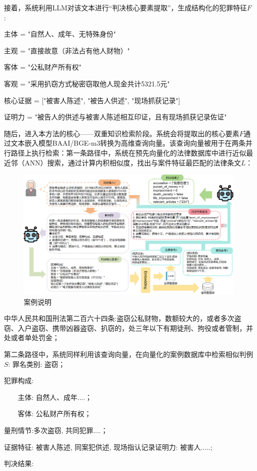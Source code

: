 接着，系统利用LLM对该文本进行“判决核心要素提取”，生成结构化的犯罪特征$F$:

主体 = "自然人、成年、无特殊身份"

主观 = "直接故意（非法占有他人财物）"

客体 = "公私财产所有权"

客观 = "采用扒窃方式秘密窃取他人现金共计5321.5元"

核心证据 = ["被害人陈述", "被告人供述", "现场抓获记录"]

证明力 = "被告人的供述与被害人陈述相互印证，且有现场抓获记录佐证"

随后，进入本方法的核心——双重知识检索阶段。系统会将提取出的核心要素$F$通过文本嵌入模型BAAI/BGE-m3转换为高维查询向量。该查询向量被用于在两条并行路径上执行检索：第一条路径中，系统在预先向量化的法律数据库中进行近似最近邻（ANN）搜索，通过计算内积相似度，找出与案件特征最匹配的法律条文$L$：

\begin{figure}[htpb]
	\centering
	\includegraphics[width=0.8\linewidth]{fig/case.pdf}
	\caption{案例说明}
	\label{fig:case}
\end{figure}

中华人民共和国刑法第二百六十四条:盗窃公私财物，数额较大的，或者多次盗窃、入户盗窃、携带凶器盗窃、扒窃的，处三年以下有期徒刑、拘役或者管制，并处或者单处罚金；

第二条路径中，系统同样利用该查询向量，在向量化的案例数据库中检索相似判例$S$:
罪名类别: 盗窃；

犯罪构成:

\ \ \ \ 主体: 自然人、成年....；

\ \ \ \ 客体: 公私财产所有权；

量刑情节:多次盗窃, 共同犯罪....；

证据特征: 被害人陈述, 同案犯供述, 现场指认记录证明力: 被害人.....;

判决结果:

